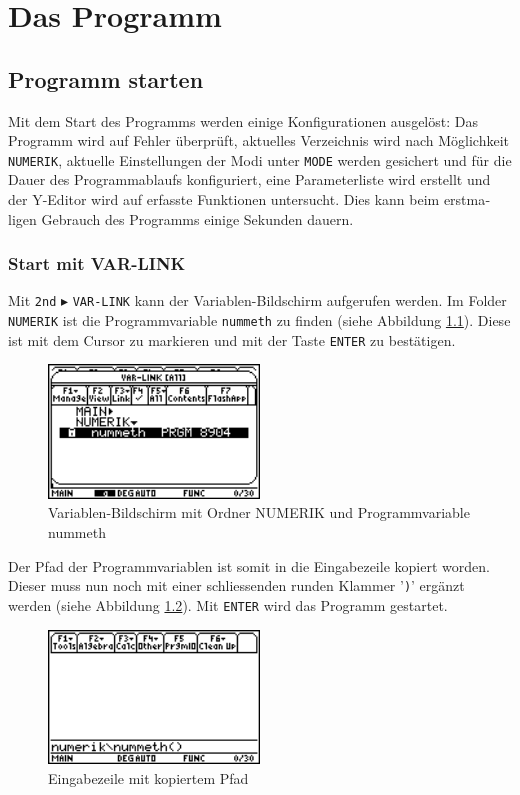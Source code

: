 \documentclass[a4paper,10pt]{scrreprt}
\begin{document}
\chapter{Das Programm}
\section{Programm starten}
Mit dem Start des Programms werden einige Konfigurationen ausgel\"ost: Das Programm wird auf Fehler \"uberpr\"uft, aktuelles Ver­zeich­nis wird nach M\"oglichkeit \verb|NUMERIK|, aktuelle Einstellungen der Modi unter \verb|MODE| werden gesichert und f\"ur die Dauer des Pro­gramm­ab­laufs konfiguriert, eine Parameterliste wird erstellt und der Y\hbox{-}Editor wird auf erfasste Funk­tio­nen untersucht. Dies kann beim erst­ma­ligen Gebrauch des Programms einige Sekunden dauern.

\subsection*{Start mit VAR-LINK}
Mit \verb|2nd| $\blacktriangleright$ \verb|VAR-LINK| kann der Variablen-Bildschirm aufgerufen werden. Im Folder \verb|NUMERIK| ist die Pro­gramm­variable \verb|nummeth| zu finden (siehe Abbildung \ref{fig:VARLINK}). Diese ist mit dem Cursor zu markieren und mit der Taste \verb|ENTER| zu bes­t\"a­ti­gen.
\begin{figure}[h]
  \centering
  \includegraphics[width=0.5\textwidth]{img/nummeth_image001.png}
  \caption[Variablen-Bildschirm]{Variablen-Bildschirm mit Ordner NUMERIK und Programmvariable nummeth}
  \label{fig:VARLINK}
\end{figure}

\newpage
Der Pfad der Programmvariablen ist somit in die Eingabezeile kopiert worden. Dieser muss nun noch mit einer schliessenden runden Klammer '\verb|)|' erg\"anzt werden (siehe Abbildung \ref{fig:CLI}). Mit \verb|ENTER| wird das Programm gestartet.
\begin{figure}[h]
  \centering
  \includegraphics[width=0.5\textwidth]{img/nummeth_image003.png}
  \caption{Eingabezeile mit kopiertem Pfad}
  \label{fig:CLI}
\end{figure}
\end{document}
